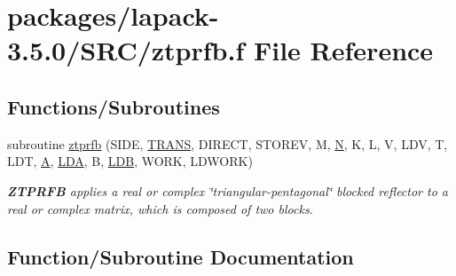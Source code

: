 \hypertarget{ztprfb_8f}{}\section{packages/lapack-\/3.5.0/\+S\+R\+C/ztprfb.f File Reference}
\label{ztprfb_8f}
\subsection*{Functions/\+Subroutines}
\begin{DoxyCompactItemize}
\item 
subroutine \hyperlink{ztprfb_8f_a87bcb9074856c6f0ee4656b802b900ea}{ztprfb} (S\+I\+D\+E, \hyperlink{superlu__enum__consts_8h_a0c4e17b2d5cea33f9991ccc6a6678d62a1f61e3015bfe0f0c2c3fda4c5a0cdf58}{T\+R\+A\+N\+S}, D\+I\+R\+E\+C\+T, S\+T\+O\+R\+E\+V, M, \hyperlink{polmisc_8c_a0240ac851181b84ac374872dc5434ee4}{N}, K, L, V, L\+D\+V, T, L\+D\+T, \hyperlink{classA}{A}, \hyperlink{example__user_8c_ae946da542ce0db94dced19b2ecefd1aa}{L\+D\+A}, B, \hyperlink{example__user_8c_a50e90a7104df172b5a89a06c47fcca04}{L\+D\+B}, W\+O\+R\+K, L\+D\+W\+O\+R\+K)
\begin{DoxyCompactList}\small\item\em {\bfseries Z\+T\+P\+R\+F\+B} applies a real or complex \char`\"{}triangular-\/pentagonal\char`\"{} blocked reflector to a real or complex matrix, which is composed of two blocks. \end{DoxyCompactList}\end{DoxyCompactItemize}


\subsection{Function/\+Subroutine Documentation}
\hypertarget{ztprfb_8f_a87bcb9074856c6f0ee4656b802b900ea}{}
